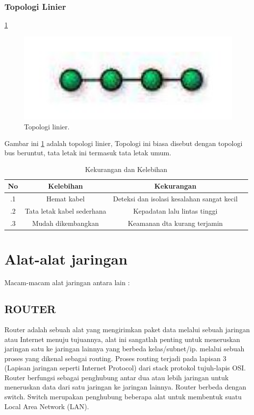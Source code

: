   \subsubsection{Topologi Linier}
    \ref{linier}
    \begin{figure}[ht]
    \centerline{\includegraphics[width=1\textwidth]{figures/linier.JPG}}
    \caption{Topologi linier.}
    \label{linier}
    \end{figure}
    Gambar ini \ref{linier} adalah topologi linier, Topologi ini biasa disebut dengan topologi bus beruntut, tata letak ini termasuk tata letak umum.

\begin{table}[ht]
	\caption{Kekurangan dan Kelebihan}
	\centering
	\begin{tabular}{cccc}
		\hline
		No&Kelebihan&Kekurangan&\\
		\hline
		.1&Hemat kabel&Deteksi dan isolasi kesalahan sangat kecil&\\
		.2&Tata letak kabel sederhana&Kepadatan lalu lintas tinggi&\\
		.3&Mudah dikembangkan& Keamanan dta kurang terjamin&\\
		\hline
	\end{tabular}
\end{table}

\section{Alat-alat jaringan}
Macam-macam alat jaringan antara lain :
  \subsection{ROUTER}
    Router adalah sebuah alat yang mengirimkan paket data melalui sebuah jaringan atau Internet menuju tujuannya, alat ini sangatlah penting untuk meneruskan jaringan satu ke jaringan lainnya yang berbeda kelas/subnet/ip. melalui sebuah proses yang dikenal sebagai routing. Proses routing terjadi pada lapisan 3 (Lapisan jaringan seperti Internet Protocol) dari stack protokol tujuh-lapis OSI.
  Router berfungsi sebagai penghubung antar dua atau lebih jaringan untuk meneruskan data dari satu jaringan ke jaringan lainnya. Router berbeda dengan switch. Switch merupakan penghubung beberapa alat untuk membentuk suatu Local Area Network (LAN).
